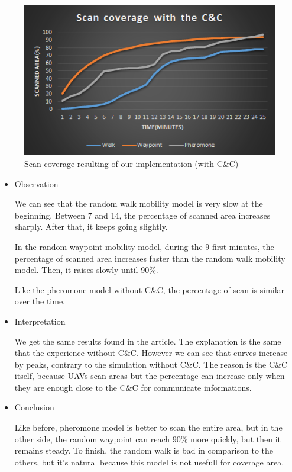 \begin{figure}[!hbtf]
\centering
   \includegraphics{../images/ScanCoverageResultCandC.png}
\caption{\label{scancoverage} Scan coverage resulting of our implementation (with C\&C)}
\end{figure}

\begin{itemize}

\item Observation

We can see that the random walk mobility model is very slow at the beginning. Between 7 and 14, the percentage of scanned area increases sharply. After that, it keeps going slightly.

In the random waypoint mobility model, during the 9 first minutes, the percentage of scanned area increases faster than the random walk mobility model. Then, it raises slowly until 90\%.

Like the pheromone model without C\&C, the percentage of scan is similar over the time.
 
\item Interpretation

We get the same results found in the article. The explanation is the same that the experience without C\&C. However we can see that curves increase by peaks, contrary to the simulation without C\&C. The reason is the C\&C itself, because UAVs scan areas but the percentage can increase only when they are enough close to the C\&C for communicate informations.

\item Conclusion

Like before, pheromone model is better to scan the entire area, but in the other side, the random waypoint can reach 90\% more quickly, but then it remains steady.
To finish, the random walk is bad in comparison to the others, but it's natural because this model is not usefull for coverage area.
\end{itemize}
